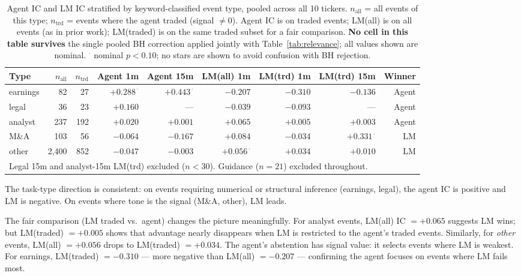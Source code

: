 \documentclass[11pt, letterpaper]{article}
\begin{document}
\begin{table}[h]
\centering
\small
\caption{Agent IC and LM IC stratified by keyword-classified event type, pooled across
all 10 tickers. $n_{\text{all}}$ = all events of this type; $n_{\text{trd}}$ = events
where the agent traded (signal $\neq 0$). Agent IC is on traded events; LM(all) is
on all events (as in prior work); LM(traded) is on the same traded subset for a fair
comparison. \textbf{No cell in this table survives} the single pooled BH correction
applied jointly with Table~\ref{tab:relevance}; all values shown are nominal.
$^{\cdot}$ nominal $p < 0.10$; no stars are shown to avoid confusion with BH rejection.}
\label{tab:eventtype}
\begin{tabular}{lrrrrrrrr}
\toprule
Type & $n_{\text{all}}$ & $n_{\text{trd}}$ & Agent 1m & Agent 15m & LM(all) 1m & LM(trd) 1m & LM(trd) 15m & Winner \\
\midrule
earnings &  82 & 27 & $+0.288^{\,\cdot}$ & $+0.443^{\,\cdot}$ & $-0.207$ & $-0.310$ & $-0.136$ & Agent \\
legal    &  36 & 23 & $+0.160$            & ---                 & $-0.039$ & $-0.093$ & ---      & Agent \\
analyst  & 237 &192 & $+0.020$            & $+0.001$            & $+0.065$ & $+0.005$ & $+0.003$ & Agent \\
M\&A     & 103 & 56 & $-0.064$            & $-0.167$            & $+0.084$ & $-0.034$ & $+0.331^{\,\cdot}$ & LM \\
other    &2,400&852 & $-0.047$            & $-0.003$            & $+0.056^{\,\cdot}$ & $+0.034$ & $+0.010$ & LM  \\
\midrule
\multicolumn{9}{l}{\footnotesize Legal 15m and analyst-15m LM(trd) excluded ($n < 30$). Guidance ($n=21$) excluded throughout.} \\
\bottomrule
\end{tabular}
\end{table}

The task-type direction is consistent: on events requiring numerical or structural
inference (earnings, legal), the agent IC is positive and LM is negative. On events
where tone is the signal (M\&A, other), LM leads.

The fair comparison (LM traded vs.\ agent) changes the picture meaningfully. For
analyst events, LM(all) IC $= +0.065$ suggests LM wins; but LM(traded) $= +0.005$
shows that advantage nearly disappears when LM is restricted to the agent's traded
events. Similarly, for \textit{other} events, LM(all) $= +0.056$ drops to LM(traded)
$= +0.034$. The agent's abstention has signal value: it selects events where LM is
weakest. For earnings, LM(traded) $= -0.310$ --- more negative than LM(all) $= -0.207$
--- confirming the agent focuses on events where LM fails most.
\end{document}
